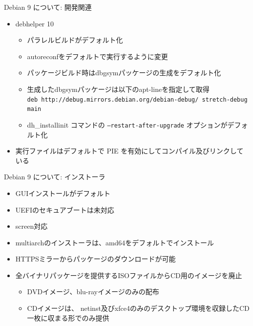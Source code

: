 \documentclass[cjk,c,squeeze,shrink,dvipdfmx,12pt]{beamer}
\begin{document}
\begin{frame}[fragile]{Debian 9 について: 開発関連}%
  \begin{itemize}
  \item debhelper 10
    \begin{itemize}
    \item パラレルビルドがデフォルト化
    \item autoreconfをデフォルトで実行するように変更
    \item パッケージビルド時はdbgsymパッケージの生成をデフォルト化
    \item 生成したdbgsymパッケージは以下のapt-lineを指定して取得\\
      {\footnotesize{%
          \texttt{deb http://debug.mirrors.debian.org/debian-debug/ stretch-debug main}}}
    \item  dh\_installinit コマンドの
      \texttt{--restart-after-upgrade} オプションがデフォルト化
    \end{itemize}
  \item 実行ファイルはデフォルトで PIE を有効にしてコンパイル及びリンクしている
  \end{itemize}
\end{frame}


\begin{frame}[fragile]{Debian 9 について: インストーラ}%

\begin{itemize}
\item GUIインストールがデフォルト
\item UEFIのセキュアブートは未対応
\item screen対応
\item multiarchのインストーラは、amd64をデフォルトでインストール
\item HTTPSミラーからパッケージのダウンロードが可能
\item 全バイナリパッケージを提供するISOファイルからCD用のイメージを廃止
  \begin{itemize}
  \item DVDイメージ、blu-rayイメージのみの配布
  \item CDイメージは、
    netinst及びxfce4のみのデスクトップ環境を収録したCD一枚に収まる形でのみ提供
  \end{itemize}
\end{itemize}

\end{frame}
\end{document}
